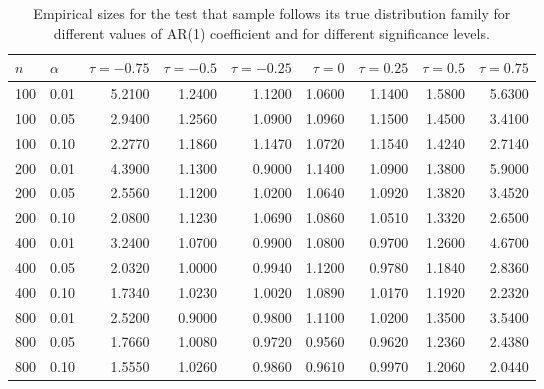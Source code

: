 \begin{table}[ht]
\centering
\caption{Empirical sizes for the test that sample follows its true
                    distribution family for
                   different values of AR(1) coefficient and for different 
                   significance levels.} 
\label{table:rr_norm}
\begin{tabular}{llrrrrrrr}
  \hline
$n$ & $\alpha$ & $\tau = -0.75$ & $\tau = -0.5$ & $\tau = -0.25$ & $\tau = 0$ & $\tau = 0.25$ & $\tau = 0.5$ & $\tau = 0.75$ \\ 
  \hline
100 & 0.01 & 5.2100 & 1.2400 & 1.1200 & 1.0600 & 1.1400 & 1.5800 & 5.6300 \\ 
  100 & 0.05 & 2.9400 & 1.2560 & 1.0900 & 1.0960 & 1.1500 & 1.4500 & 3.4100 \\ 
  100 & 0.10 & 2.2770 & 1.1860 & 1.1470 & 1.0720 & 1.1540 & 1.4240 & 2.7140 \\ 
  200 & 0.01 & 4.3900 & 1.1300 & 0.9000 & 1.1400 & 1.0900 & 1.3800 & 5.9000 \\ 
  200 & 0.05 & 2.5560 & 1.1200 & 1.0200 & 1.0640 & 1.0920 & 1.3820 & 3.4520 \\ 
  200 & 0.10 & 2.0800 & 1.1230 & 1.0690 & 1.0860 & 1.0510 & 1.3320 & 2.6500 \\ 
  400 & 0.01 & 3.2400 & 1.0700 & 0.9900 & 1.0800 & 0.9700 & 1.2600 & 4.6700 \\ 
  400 & 0.05 & 2.0320 & 1.0000 & 0.9940 & 1.1200 & 0.9780 & 1.1840 & 2.8360 \\ 
  400 & 0.10 & 1.7340 & 1.0230 & 1.0020 & 1.0890 & 1.0170 & 1.1920 & 2.2320 \\ 
  800 & 0.01 & 2.5200 & 0.9000 & 0.9800 & 1.1100 & 1.0200 & 1.3500 & 3.5400 \\ 
  800 & 0.05 & 1.7660 & 1.0080 & 0.9720 & 0.9560 & 0.9620 & 1.2360 & 2.4380 \\ 
  800 & 0.10 & 1.5550 & 1.0260 & 0.9860 & 0.9610 & 0.9970 & 1.2060 & 2.0440 \\ 
   \hline
\end{tabular}
\end{table}

